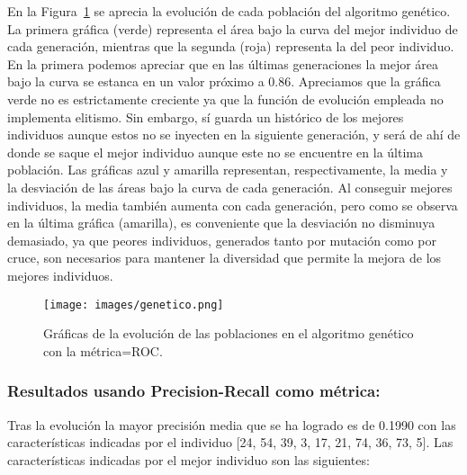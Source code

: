 \documentclass[a4paper,12pt,twoside,oldfontcommands]{memoir}
\begin{document}
	
	En la Figura~\ref{fig:genetico} se aprecia la evolución de cada población del algoritmo genético. La primera gráfica (verde) representa el área bajo la curva del mejor individuo de cada generación, mientras que la segunda (roja) representa la del peor individuo. En la primera podemos apreciar que en las últimas generaciones la mejor área bajo la curva se estanca en un valor próximo a 0.86. Apreciamos que la gráfica verde no es estrictamente creciente ya que la función de evolución empleada no implementa elitismo. Sin embargo, sí guarda un histórico de los mejores individuos aunque estos no se inyecten en la siguiente generación, y será de ahí de donde se saque el mejor individuo aunque este no se encuentre en la última población. Las gráficas azul y amarilla representan, respectivamente, la media y la desviación de las áreas bajo la curva de cada generación. Al conseguir mejores individuos, la media también aumenta con cada generación, pero como se observa en la última gráfica (amarilla), es conveniente que la desviación no disminuya demasiado, ya que peores individuos, generados tanto por mutación como por cruce, son necesarios para mantener la diversidad que permite la mejora de los mejores individuos.  
	
	\begin{figure}
		\centering
		\texttt{[image: images/genetico.png]}
		\caption{Gráficas de la evolución de las poblaciones en el algoritmo genético con la métrica=ROC.}
		\label{fig:genetico}
	\end{figure}
	
	\subsubsection{Resultados usando Precision-Recall como métrica:} 
	
	Tras la evolución la mayor precisión media que se ha logrado es de 0.1990 con las características indicadas por el individuo [24, 54, 39, 3, 17, 21, 74, 36, 73, 5]. Las características indicadas por el mejor individuo son las siguientes:
	
\end{document}
